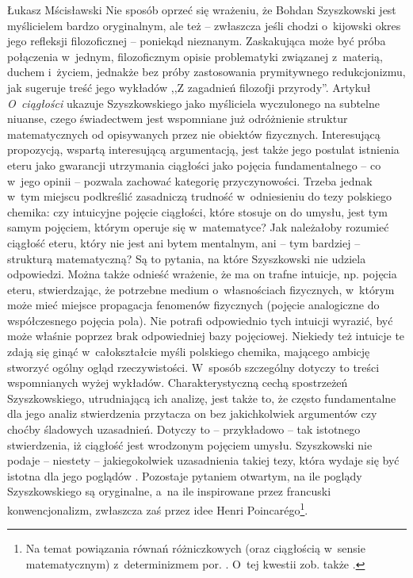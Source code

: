 \begin{artplenv}{Łukasz Mścisławski}
\noindent Nie sposób oprzeć się wrażeniu, że Bohdan Szyszkowski jest myślicielem bardzo oryginalnym, ale też -- zwłaszcza jeśli chodzi o~kijowski okres jego refleksji filozoficznej -- poniekąd nieznanym. Zaskakująca może być próba połączenia w~jednym, filozoficznym opisie problematyki związanej z~materią, duchem i~życiem, jednakże bez próby zastosowania prymitywnego redukcjonizmu, jak sugeruje treść jego wykładów ,,Z zagadnień filozofji przyrody''. Artykuł \textit{O~ciągłości} ukazuje Szyszkowskiego jako myśliciela wyczulonego na subtelne niuanse, czego świadectwem jest wspomniane już odróżnienie struktur matematycznych od opisywanych przez nie obiektów fizycznych. Interesującą propozycją, wspartą interesującą argumentacją, jest także jego postulat istnienia eteru jako gwarancji utrzymania ciągłości jako pojęcia fundamentalnego -- co w~jego opinii -- pozwala zachować kategorię przyczynowości. Trzeba jednak w~tym miejscu podkreślić zasadniczą trudność w~odniesieniu do tezy polskiego chemika: czy intuicyjne pojęcie ciągłości, które stosuje on do umysłu, jest tym samym pojęciem, którym operuje się w~matematyce? Jak należałoby rozumieć ciągłość eteru, który nie jest ani bytem mentalnym, ani -- tym bardziej -- strukturą matematyczną? Są to pytania, na które Szyszkowski nie udziela odpowiedzi. Można także odnieść wrażenie, że ma on trafne intuicje, np. pojęcia eteru, stwierdzając, że potrzebne medium o~własnościach fizycznych, w~którym może mieć miejsce propagacja fenomenów fizycznych (pojęcie analogiczne do współczesnego pojęcia pola). Nie potrafi odpowiednio tych intuicji wyrazić, być może właśnie poprzez brak odpowiedniej bazy pojęciowej. Niekiedy też intuicje te zdają się ginąć w~całokształcie myśli polskiego chemika, mającego ambicję stworzyć ogólny ogląd rzeczywistości. W~sposób szczególny dotyczy to treści wspomnianych wyżej wykładów. Charakterystyczną cechą spostrzeżeń Szyszkowskiego, utrudniającą ich analizę, jest także to, że często fundamentalne dla jego analiz stwierdzenia przytacza on bez jakichkolwiek argumentów czy choćby śladowych uzasadnień. Dotyczy to -- przykładowo -- tak istotnego stwierdzenia, iż ciągłość jest wrodzonym pojęciem umysłu. Szyszkowski nie podaje -- niestety -- jakiegokolwiek uzasadnienia takiej tezy, która wydaje się być istotna dla jego poglądów
\parencite[por.][s.~47]{szyszkowski_o_1916}. %
Pozostaje pytaniem otwartym, na ile poglądy Szyszkowskiego są oryginalne, a~na ile inspirowane przez francuski konwencjonalizm, zwłaszcza zaś przez idee Henri
Poincarégo\footnote{Na temat powiązania równań różniczkowych (oraz ciągłością w~sensie matematycznym) z~determinizmem por. 
\parencites[][s.~98–135]{poincare_nauka_1908}[][s.~98–135, 160–169]{poincare_wartosc_1908}. O~tej kwestii zob. także 
\parencite[][s.~80–81]{leszczynski_wprowadzenie_2003}.}.


\end{artplenv}
